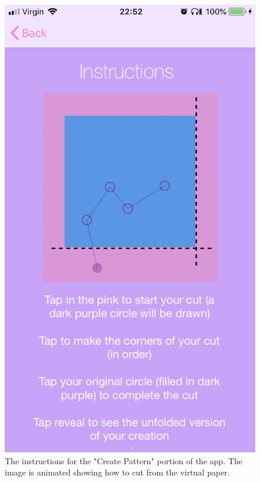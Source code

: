 \documentclass[11pt]{article}
\begin{document}
               \begin{figure}[!ht]
                                \begin{minipage}{0.45\textwidth}
                                    \centering \includegraphics[width=0.7\linewidth]{KiriZen/instructionsCreate.png}
                                    \caption{The instructions for the "Create Pattern" portion of the app. The image is animated showing how to cut from the virtual paper.}
                                    \label{fig:kiriZen-instructionsCreate}
                                \end{minipage}\hfill
                                \begin{minipage}{0.45\textwidth}
                                    \centering

\end{minipage}
\end{figure}
\end{document}
